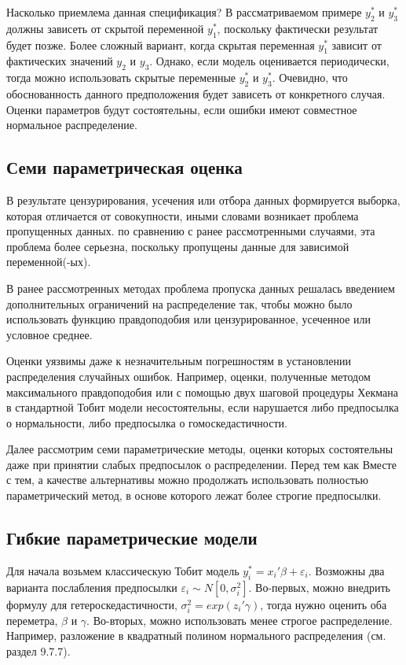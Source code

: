 Насколько приемлема данная спецификация? В рассматриваемом примере $y_2^{*}$ и $y_3^{*}$ должны зависеть от скрытой переменной $y_1^{*}$, поскольку фактически результат будет позже. Более сложный вариант, когда скрытая переменная $y_1^{*}$ зависит от фактических значений $y_2$ и $y_3$. Однако, если модель оценивается периодически, тогда можно использовать скрытые переменные $y_2^{*}$ и $y_3^{*}$. Очевидно, что обоснованность данного предположения будет зависеть от конкретного случая. Оценки параметров будут состоятельны, если ошибки имеют совместное нормальное распределение.

\subsection{Семи параметрическая оценка}

В результате цензурирования, усечения или отбора данных формируется выборка, которая отличается от совокупности, иными словами возникает проблема пропущенных данных. по сравнению с ранее рассмотренными случаями, эта проблема более серьезна, поскольку пропущены данные для зависимой переменной(-ых).

В ранее рассмотренных методах проблема пропуска данных решалась введением дополнительных ограничений на распределение так, чтобы можно было использовать функцию правдоподобия или цензурированное, усеченное или условное среднее.

Оценки уязвимы даже к незначительным погрешностям в установлении распределения случайных ошибок. Например, оценки, полученные методом максимального правдоподобия или с помощью двух шаговой процедуры Хекмана в стандартной Тобит модели несостоятельны, если нарушается либо предпосылка о нормальности, либо предпосылка о гомоскедастичности. 

Далее рассмотрим семи параметрические методы, оценки которых состоятельны даже при принятии слабых предпосылок о распределении. Перед тем как Вместе с тем, а качестве альтернативы можно продолжать использовать полностью параметрический метод, в основе которого лежат более строгие предпосылки.

\subsection{Гибкие параметрические модели}

Для начала возьмем классическую Тобит модель $y_i^{*}=x_i'\beta+\varepsilon_i$. Возможны два варианта послабления предпосылки $\varepsilon_i{\sim}N[0,\sigma_i^2]$. Во-первых, можно внедрить формулу для гетероскедастичности, $\sigma_i^2=exp(z_i'\gamma)$, тогда нужно оценить оба переметра, $\beta$ и $\gamma$. Во-вторых, можно использовать менее строгое распределение. Например, разложение в квадратный полином нормального распределения (см. раздел 9.7.7).

